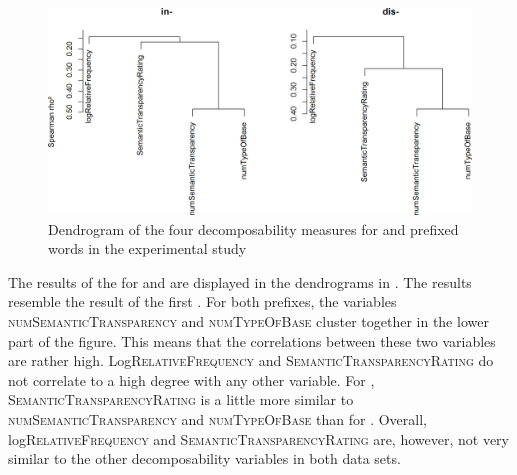   \begin{figure}
  	
  	\includegraphics[scale=0.5]{images/Experiment/clusterAnalysisDecomposabilityExpDisAndIn.png}
  	\caption{Dendrogram of the four decomposability measures for  and prefixed words in the experimental study}
  	\label{fig:cluster experiment dis and in}
  \end{figure}
  
 The results of the  for  and  are displayed in the dendrograms in . The results resemble the result of the first .
 For both prefixes, the variables \textsc{numSemanticTransparency} and \textsc{numTypeOfBase} cluster together in the lower part of the figure. This means that the correlations between these two variables are rather high. Log\textsc{RelativeFrequency} and \textsc{SemanticTransparencyRating} do not correlate to a high degree with any other variable.
 For , \textsc{SemanticTransparencyRating} is a little more similar to \textsc{numSemanticTransparency} and \textsc{numTypeOfBase} than for . 
 Overall, log\textsc{RelativeFrequency} and \textsc{SemanticTransparencyRating} are, however, not very similar to the other decomposability variables in both data sets. 

